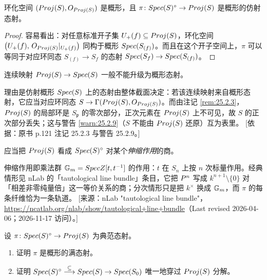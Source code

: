 \begin{proposition}\label{prop:25.2.4}
环化空间 $(Proj(S), O_{Proj(S)})$ 是概形，且 $\pi \colon Spec(S)^{\circ} \to Proj(S)$ 是概形的仿射态射。
\end{proposition}

\begin{proof}
容易看出：对任意标准开子集 $U_+(f) \subseteq Proj(S)$，环化空间 $\bigl(U_+(f),\, O_{Proj(S)}|_{U_+(f)}\bigr)$ 同构于概形 $Spec(S_{(f)})$。而且在这个开子空间上，$\pi$ 可以等同于对应环同态 $S_{(f)} \to S_f$ 的态射 $Spec(S_f) \to Spec(S_{(f)})$。
\end{proof}

\begin{warning}\label{warn:25.2.5}
连续映射 $Proj(S) \to Spec(S)$ 一般不能升级为概形态射。
\end{warning}

\begin{yizhu}
理由是仿射概形 $Spec(S)$ 上的态射由整体截面决定：若该连续映射来自概形态射，它应当对应环同态 $S \to \Gamma(Proj(S), O_{Proj(S)})$。而由注记 \ref{rem:25.2.3}，$Proj(S)$ 的局部环是 $S_{\mathfrak p}$ 的零次部分，正次元素在 $Proj(S)$ 上不可见，故 $S$ 的正次部分丢失；这与警告 \ref{warn:25.2.9}（$S$ 不能由 $Proj(S)$ 还原）互为表里。
[依据：原书 p.121 注记 25.2.3 与警告 25.2.9。]
\end{yizhu}

\begin{remark}\label{rem:25.2.6}
应当把 $Proj(S)$ 看成 $Spec(S)^{\circ}$ 对某个\emph{伸缩作用}的商。
\end{remark}

\begin{yizhu}
伸缩作用即乘法群 $\mathbb{G}_m = Spec Z[t, t^{-1}]$ 的作用：$t$ 在 $S_n$ 上按 $n$ 次标量作用。经典情形见 nLab 的「tautological line bundle」条目，它把 $P^n$ 写成 $k^{n+1} \setminus \{0\}$ 对「相差非零纯量倍」这一等价关系的商；分次情形只是把 $k^\times$ 换成 $\mathbb{G}_m$，而 $\pi$ 的每条纤维恰为一条轨道。
[来源：nLab "tautological line bundle"，\url{https://ncatlab.org/nlab/show/tautological+line+bundle}（Last revised 2026-04-06；2026-11-17 访问）。]
\end{yizhu}

\begin{exercise}\label{exc:25.2.7}
设 $\pi \colon Spec(S)^{\circ} \to Proj(S)$ 为典范态射。
\begin{enumerate}[label=(\arabic*),leftmargin=2.4em,itemsep=0.25ex]
  \item 证明 $\pi$ 是概形的满态射。
  \item 证明 $Spec(S)^{\circ} \overset{\subseteq}{\longrightarrow} Spec(S) \to Spec(S_0)$ 唯一地穿过 $Proj(S)$ 分解。
\end{enumerate}
\end{exercise}

